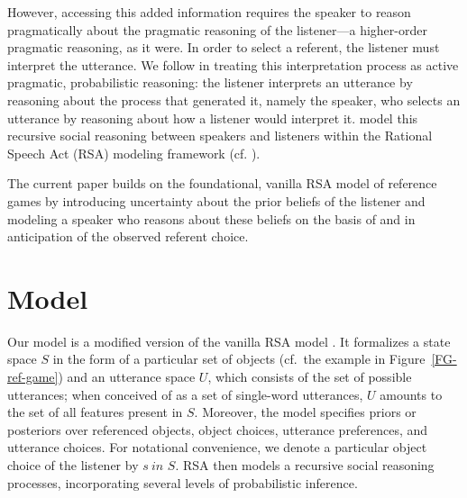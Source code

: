 \documentclass[10pt,a4paper]{article}
\newcommand{\sem}[1]{\mbox{$[\![$#1$]\!]$}}
\newcommand{\gcs}[1]{\textcolor{blue}{[gcs: #1]}}
\begin{document}
However, accessing this added information requires the speaker to reason pragmatically about the pragmatic reasoning of the listener---a higher-order pragmatic reasoning, as it were.
In order to select a referent, the listener must interpret the utterance. We follow  in treating this interpretation process as active pragmatic, probabilistic reasoning: the listener interprets an utterance by reasoning about the process that generated it, namely the speaker, who selects an utterance by reasoning about how a listener would interpret it. \citeauthor{frankgoodman2012} model this recursive social reasoning between speakers and listeners within the Rational Speech Act (RSA) modeling framework (cf. ).

The current paper builds on the foundational, vanilla RSA model of reference games by introducing uncertainty about the prior beliefs of the listener and modeling a speaker who reasons about these beliefs on the basis of and in anticipation of the observed referent choice. 



\section{Model}
Our model is a modified version of the vanilla RSA model \cite{frankgoodman2012}. 
It formalizes a state space $S$ in the form of a particular set of objects (cf.~the example in Figure~\ref{FG-ref-game}) and an utterance space $U$, which consists of the set of possible utterances; when conceived of as a set of single-word utterances, $U$ amounts to the set of all features present in $S$. 
Moreover, the model 
specifies priors or posteriors over referenced objects, object choices, utterance preferences, and utterance choices. 
For notational convenience, we denote a particular object choice of the listener by $s \ in$ $S$.
RSA then models a recursive social reasoning processes, incorporating several levels of probabilistic inference. 
\end{document}
